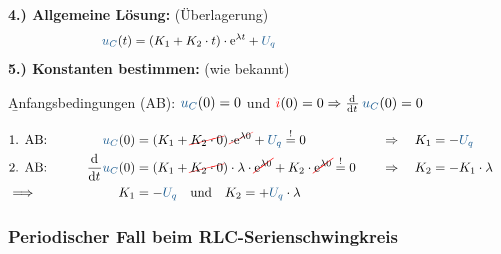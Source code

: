 \begin{frame}\ftx{\subsubsecname}%
    \textbf{4.) Allgemeine Lösung:} (Überlagerung)%
    \begin{align}
        &&
            \ecv{u_C}(t) &= \left( K_1 + K_2 \cdot t \right) \cdot \mathrm{e}^{\lambda t} + \ecv{U_q} \nonumber\\[-14pt]
        &\hphantom{1Rooooooo}&\hphantom{2Loooooo}&\hphantom{2Roooooooooooooooooooooooooooooooooo}&\hphantom{3Loooooo}&\hphantom{3Roooooooooo} \nonumber %
    \end{align}
    \textbf{5.) Konstanten bestimmen:} (wie bekannt)

    \b{\vspace{4pt}Anfangsbedingungen (AB): $\ecv{u_C}(0)=0$ und $\eci{i}(0)=0 \Rightarrow \dt\, \ecv{u_C}(0) = 0 $}

    \begin{align}
        &\hphantom{1Rooooooo}&\hphantom{2Loooooo}&\hphantom{2Roooooooooooooooooooooooooooooooooo}&\hphantom{3Loooooo}&\hphantom{3Roooooooooo} \nonumber\\[-15pt] %
        &\text{1. AB:}&
            \ecv{u_C}(0) &= \left( K_1 + \redcancel{K_2 \cdot 0 }\right) \redcancel{\cdot \mathrm{e}^{\lambda 0}} + \ecv{U_q} \overset{!}{=} 0 & \Rightarrow\quad K_1 &= -\ecv{U_q} \nonumber\\
        &\text{2. AB:}&
            \dt \ecv{u_C}(0) &= \left( K_1 + \redcancel{K_2 \cdot 0} \right) \cdot \lambda \cdot \redcancel{\mathrm{e}^{\lambda 0}} + K_2 \cdot \redcancel{\mathrm{e}^{\lambda 0}} \overset{!}{=} 0 & \Rightarrow\quad K_2 &= -K_1 \cdot \lambda \nonumber\\
            &\Longrightarrow&
        K_1 &= -\ecv{U_q} \quad\text{und}\quad
                K_2 = +\ecv{U_q} \cdot \lambda
            \label{eq:dgl:rlc:dc:konstanten:grenzfall}
    \end{align}%
\end{frame}


\subsubsection[Periodischer Fall]{Periodischer Fall beim RLC-Serienschwingkreis}
\label{sec:schaltvorgaengezeitbereich:rlc:periodisch}

